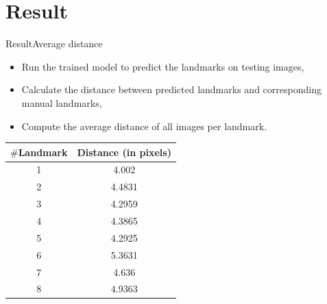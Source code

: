 \documentclass[10pt]{beamer}
\begin{document}
\section{Result}
\begin{frame}{Result}{Average distance}
	\begin{itemize}
		\item Run the trained model to predict the landmarks on testing images,
		\item Calculate the distance between predicted landmarks and corresponding manual landmarks,
		\item Compute the average distance of all images per landmark.
	\end{itemize}
	\begin{center}
		\begin{table}[htbp]
		\centering
		\begin{tabular}{|c|c|}
		\hline
		\textbf{$\#$Landmark} & \textbf{Distance} (in pixels) \\ \hline
			1 & 4.002  \\ \hline
			2 & 4.4831 \\ \hline
			3 & 4.2959 \\ \hline
			4 & 4.3865 \\ \hline
			5 & 4.2925 \\ \hline
			6 & 5.3631 \\ \hline
			7 & 4.636 \\ \hline
			8 & 4.9363 \\ \hline
		\end{tabular}

		\end{table}
	\end{center}
\end{frame}

\end{document}
